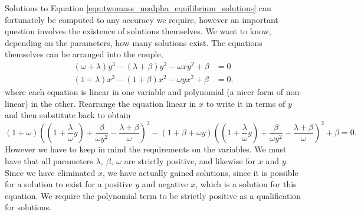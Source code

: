 \documentclass{report}
\begin{document}
Solutions to Equation \ref{eqn:twomass_noalpha_equilibrium_solutions} can fortunately be computed to any accuracy we require,
however an important question involves the existence of solutions themselves.
We want to know, depending on the parameters, how many solutions exist.
The equations themselves can be arranged into the couple,
\begin{equation}
    \begin{aligned}
        (\omega + \lambda)y^3 - (\lambda + \beta)y^2 - \omega x y^2 + \beta &= 0 \\
        (1 + \lambda)x^3 - (1 + \beta)x^2 - \omega y x^2 + \beta &= 0.
    \end{aligned}
\end{equation}
where each equation is linear in one variable and polynomial (a nicer form of non-linear) in the other.
Rearrange the equation linear in $x$ to write it in terms of $y$ and then substitute back to obtain
\begin{equation}
    (1+\omega)\left( \left( 1 + \frac{\lambda}{\omega}y \right) + \frac{\beta}{\omega y^2} - \frac{\lambda + \beta}{\omega}\right)^3 - (1+\beta+\omega y)\left( \left( 1 + \frac{\lambda}{\omega}y \right) + \frac{\beta}{\omega y^2} - \frac{\lambda + \beta}{\omega}\right)^2 + \beta = 0.
    \label{eqn:twomass_equilibria_polynomial}
\end{equation}
However we have to keep in mind the requirements on the variables.
We must have that all parameters \(\lambda,~\beta,~\omega\) are strictly positive, and likewise for \(x\) and \(y\).
Since we have eliminated $x$, we have actually gained solutions, since it is possible for a solution to exist for a positive $y$ and negative $x$, which is a solution for this equation.
We require the polynomial term to be strictly positive as a qualification for solutions. %
\end{document}
